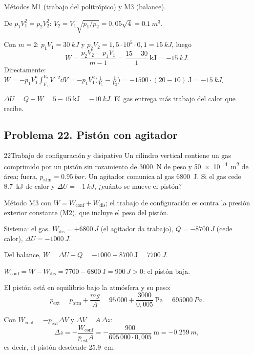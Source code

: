 \begin{resolucion}
\idea Métodos M1 (trabajo del politrópico) y M3 (balance).

 De $p_1V_1^2=p_2V_2^2$:
$V_2=V_1\sqrt{p_1/p_2}=0{,}05\sqrt{4}=\SI{0,1}{m^3}$.

 Con $m=2$: $p_1V_1=\SI{30}{kJ}$ y $p_2V_2=1{,}5\cdot10^{5}\cdot0{,}1=\SI{15}{kJ}$, luego
\[
  W=\frac{p_2V_2-p_1V_1}{m-1}=\frac{15-30}{1}\ \mathrm{kJ}=-\SI{15}{kJ}.
\]
Directamente: $W=-p_1V_1^2\int_{V_1}^{V_2}V^{-2}\dd V=-p_1V_1^2\bigl(\tfrac1{V_1}-\tfrac1{V_2}\bigr)
=-1500\cdot(20-10)\ \mathrm J=-\SI{15}{kJ}$.

$\Delta U=Q+W=5-15\ \mathrm{kJ}=\boxed{-\SI{10}{kJ}}$. El gas entrega más trabajo del calor que recibe.
\end{resolucion}

\subsection{Problema 22. Pistón con agitador}
\begin{problema}{22}{Trabajo de configuración y disipativo}
Un cilindro vertical contiene un gas comprimido por un pistón sin rozamiento de \SI{3000}{N} de peso y
\SI{50e-4}{m^2} de área; fuera, $p_{\mathrm{atm}}=\SI{0,95}{bar}$. Un agitador comunica al gas \SI{6800}{J}. Si el gas
cede \SI{8,7}{kJ} de calor y $\Delta U=-\SI{1}{kJ}$, ¿cuánto se mueve el pistón?
\end{problema}

\begin{resolucion}
\idea Método M3 con $W=W_{\mathrm{conf}}+W_{\mathrm{dis}}$; el trabajo de configuración es contra la presión
exterior constante (M2), que incluye el peso del pistón.

 Sistema: el gas. $W_{\mathrm{dis}}=+\SI{6800}{J}$ (el agitador da trabajo),
$Q=-\SI{8700}{J}$ (cede calor), $\Delta U=-\SI{1000}{J}$.

 Del balance,
$W=\Delta U-Q=-1000+8700\ \mathrm J=\SI{7700}{J}$.

$W_{\mathrm{conf}}=W-W_{\mathrm{dis}}=7700-6800\ \mathrm J=\SI{900}{J}>0$: el pistón baja.

 El pistón está en equilibrio bajo la atmósfera y su peso:
\[
  p_{\mathrm{ext}}=p_{\mathrm{atm}}+\frac{mg}{A}=95\,000+\frac{3000}{0{,}005}\ \mathrm{Pa}=\SI{695000}{Pa}.
\]

 Con $W_{\mathrm{conf}}=-p_{\mathrm{ext}}\Delta V$ y $\Delta V=A\,\Delta z$:
\[
  \Delta z=-\frac{W_{\mathrm{conf}}}{p_{\mathrm{ext}}A}=-\frac{900}{695\,000\cdot0{,}005}\ \mathrm m
         =\boxed{-\SI{0,259}{m}},
\]
es decir, el pistón desciende \SI{25,9}{cm}.
\end{resolucion}


